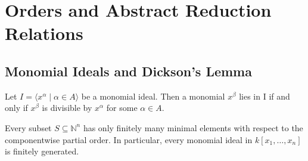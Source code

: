 \chapter{Orders and Abstract Reduction Relations} 

\section{Monomial Ideals and Dickson’s Lemma}

\begin{lemma}
    Let $I = \langle x^\alpha \mid \alpha \in A \rangle$ be a monomial ideal.
    Then a monomial $x^\beta$ lies in I if and only if $x^\beta$ is divisible by $x^\alpha$ for some $\alpha \in A$.
\end{lemma}

\begin{theorem}\label{thm:Dickson}
    Every subset $S\subseteq \mathbb{N}^n$ has only finitely many minimal elements with respect to the componentwise partial order. 
    In particular, every monomial ideal in $k[x_1,\dots,x_n]$ is finitely generated.
\end{theorem}